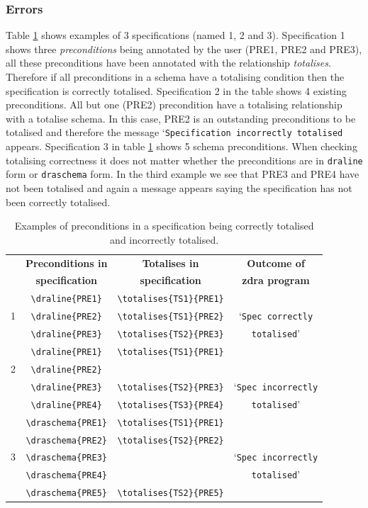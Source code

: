 \subsubsection{Errors}
\label{subsubsec:zdra_toterrors}

Table \ref{tab:totalisecorrect} shows examples of 3 specifications (named 1, 2
and 3). Specification 1 shows three \emph{preconditions} being annotated by the
user (PRE1, PRE2 and PRE3), all these preconditions have been annotated with the
relationship \emph{totalises}. Therefore if all preconditions in a schema have a
totalising condition then the specification is correctly totalised.
Specification 2 in the table shows 4 existing preconditions. All but one (PRE2)
precondition have a totalising relationship with a totalise schema. In this
case, PRE2 is an outstanding preconditions to be totalised and therefore the
message `\texttt{Specification incorrectly totalised} appears. Specification 3 in
table \ref{tab:totalisecorrect} shows 5 schema preconditions. When checking
totalising correctness it does not matter whether the preconditions are in
\verb|draline| form or \verb|draschema| form. In the third example we see that
PRE3 and PRE4 have not been totalised and again a message appears saying the
specification has not been correctly totalised.

\begin{table}[H]
\begin{tabular}{|c|c|c|c|}
\hline
& \textbf{Preconditions in} & \textbf{Totalises in} & \textbf{Outcome of} \\
& \textbf{specification} & \textbf{specification} & \textbf{\gls{zdra} program}
\\
\hline
\hline
& \verb|\draline{PRE1}| & \verb|\totalises{TS1}{PRE1}| & \\
1 & \verb|\draline{PRE2}| & \verb|\totalises{TS1}{PRE2}| & `\texttt{Spec
correctly} \\
& \verb|\draline{PRE3}| & \verb|\totalises{TS2}{PRE3}|& \texttt{totalised}'\\
\hline
& \verb|\draline{PRE1}| & \verb|\totalises{TS1}{PRE1}| &  \\
2 & \verb|\draline{PRE2}| & & \\
& \verb|\draline{PRE3}| & \verb|\totalises{TS2}{PRE3}|& `\texttt{Spec
incorrectly} \\
& \verb|\draline{PRE4}| & \verb|\totalises{TS3}{PRE4}|& \texttt{totalised}' \\
\hline
& \verb|\draschema{PRE1}| & \verb|\totalises{TS1}{PRE1}| &  \\
 & \verb|\draschema{PRE2}| & \verb|\totalises{TS2}{PRE2}| & \\
3 & \verb|\draschema{PRE3}| & & `\texttt{Spec incorrectly} \\
& \verb|\draschema{PRE4}| &  & \texttt{totalised}' \\
& \verb|\draschema{PRE5}| & \verb|\totalises{TS2}{PRE5}|  & \\
\hline
\end{tabular}
\caption{\label{tab:totalisecorrect} Examples of preconditions in a specification being correctly totalised and incorrectly totalised.}
\end{table}

